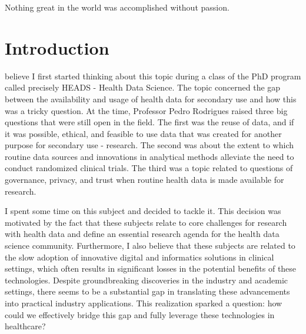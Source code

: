 

\begin{savequote}[85mm]
    Nothing great in the world was accomplished 
    without passion.
    \end{savequote}


\chapter{Introduction} \label{chap:intro}

\acresetall

{} believe I first started thinking about this topic during a class of the PhD program called precisely HEADS - Health Data Science. The topic concerned the gap between the availability and usage of health data for secondary use and how this was a tricky question. At the time, Professor Pedro Rodrigues raised three big questions that were still open in the field. The first was the reuse of data, and if it was possible, ethical, and feasible to use data that was created for another purpose for secondary use - research. The second was about the extent to which routine data sources and innovations in analytical methods alleviate the need to conduct randomized clinical trials. The third was a topic related to questions of governance, privacy, and trust when routine health data is made available for research.

I spent some time on this subject and decided to tackle it. This decision was motivated by the fact that these subjects relate to core challenges for research with health data and define an essential research agenda for the health data science community. Furthermore, I also believe that these subjects are related to the slow adoption of innovative digital and informatics solutions in clinical settings, which often results in significant losses in the potential benefits of these technologies. Despite groundbreaking discoveries in the industry and academic settings, there seems to be a substantial gap in translating these advancements into practical industry applications. This realization sparked a question: how could we effectively bridge this gap and fully leverage these technologies in healthcare?




